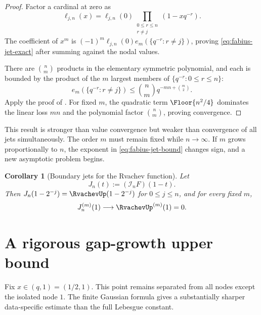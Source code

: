 \documentclass[11pt,oneside]{book}
\numberwithin{equation}{chapter}
\newtheorem{corollary}[theorem]{Corollary}
\theoremstyle{definition}
\theoremstyle{remark}
\newcommand{\Interp}{\mathcal I}
\begin{document}
\begin{proof}
Factor a cardinal at zero as
\[
 \ell_{j,n}(x)=\ell_{j,n}(0)
 \prod_{\substack{0\le r\le n\\r\ne j}}(1-xq^{-r}).
\]
The coefficient of $x^m$ is
$(-1)^m\ell_{j,n}(0)e_m(\{q^{-r}:r\ne j\})$, proving
\eqref{eq:fabius-jet-exact} after summing against the nodal values.

There are $\binom nm$ products in the elementary symmetric polynomial, and
each is bounded by the product of the $m$ largest members of
$\{q^{-r}:0\le r\le n\}$:
\begin{equation}
 e_m(\{q^{-r}:r\ne j\})
 \le\binom nm q^{-mn+\binom m2}.
 \label{eq:elementary-symmetric-jet-bound}
\end{equation}
Apply the proof of .  For fixed $m$, the
quadratic term $\Floor{n^2/4}$ dominates the linear loss $mn$ and the
polynomial factor $\binom nm$, proving convergence.
\end{proof}

This result is stronger than value convergence but weaker than convergence
of all jets simultaneously.  The order $m$ must remain fixed while
$n\to\infty$.  If $m$ grows proportionally to $n$, the exponent in
\eqref{eq:fabius-jet-bound} changes sign, and a new asymptotic problem begins.

\begin{corollary}[Boundary jets for the Rvachev function]
\label{cor:up-boundary-jets}
Let
\begin{equation}
 J_n(t):=(\Interp_nF)(1-t).
 \label{eq:up-reflected-interpolant}
\end{equation}
Then $J_n(1-2^{-j})=\RvachevUp(1-2^{-j})$ for $0\le j\le n$, and for every fixed
$m$,
\begin{equation}
 J_n^{(m)}(1)\longrightarrow\RvachevUp^{(m)}(1)=0.
 \label{eq:up-fixed-boundary-jet}
\end{equation}
\end{corollary}

\section{A rigorous gap-growth upper bound}
\label{sec:fabius-gap-bound}

Fix $x\in(q,1)=(1/2,1)$.  This point remains separated from all nodes except
the isolated node $1$.  The finite Gaussian formula gives a substantially
sharper data-specific estimate than the full Lebesgue constant.
\end{document}

